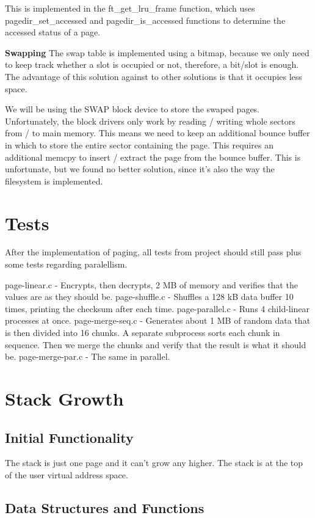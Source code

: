 This is implemented in the ft\_get\_lru\_frame function, which uses pagedir\_set\_accessed and pagedir\_is\_accessed functions to determine the accessed status of a page.

\textbf{Swapping}
The swap table is implemented using a bitmap, because we only need to keep track whether a slot is occupied or not, therefore, a bit/slot is enough. The advantage of this solution against to other solutions is that it occupies less space.

We will be using the SWAP block device to store the swaped pages. Unfortunately, the block drivers only work by reading / writing whole sectors from / to main memory. This means we need to keep an additional bounce buffer in which to store the entire sector containing the page. This requires an additional memcpy to insert / extract the page from the bounce buffer. This is unfortunate, but we found no better solution, since it's also the way the filesystem is implemented.

\section{Tests}

After the implementation of paging, all tests from project should still pass plus some tests regarding paralellism.

page-linear.c - Encrypts, then decrypts, 2 MB of memory and verifies that the values are as they should be.
page-shuffle.c - Shuffles a 128 kB data buffer 10 times, printing the checksum after each time.
page-parallel.c - Runs 4 child-linear processes at once.
page-merge-seq.c - Generates about 1 MB of random data that is then divided into 16 chunks.  A separate subprocess sorts each chunk in sequence.  Then we merge the chunks and verify that the result is what it should be.
page-merge-par.c - The same in parallel.

\section{Stack Growth}
\subsection{Initial Functionality}

The stack is just one page and it can't grow any higher. The stack is at the top of the user
virtual address space.

\subsection{Data Structures and Functions}

